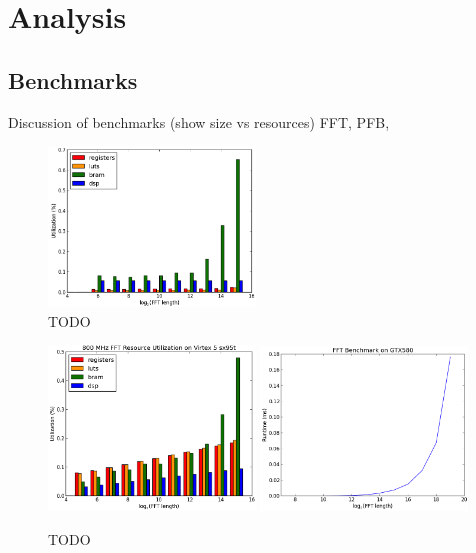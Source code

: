 \chapter{Analysis} \label{Analysis}

\section{Benchmarks}
Discussion of benchmarks (show size vs resources) FFT, PFB,

\begin{figure}[ht!]
  \centering
    \includegraphics[width=0.49\textwidth]{Images/C6/pfb_bench.png}
  \caption{TODO}
  \label{fig: C6/pfb_bench.png}
\end{figure}

\begin{figure}[ht!]
  \centering
    \includegraphics[width=0.49\textwidth]{Images/C6/fft_bench.png}
    \includegraphics[width=0.49\textwidth]{Images/C6/fft_gpu_bench.png}
  \caption{TODO}
  \label{fig: C6/fft_bench.png}
\end{figure}

